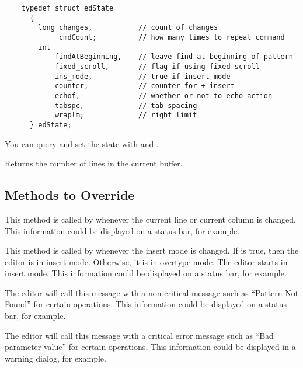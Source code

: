 \footnotesize
\begin{verbatim}
    typedef struct edState
      {
        long changes,           // count of changes
             cmdCount;          // how many times to repeat command
        int
            findAtBeginning,    // leave find at beginning of pattern
            fixed_scroll,       // flag if using fixed scroll
            ins_mode,           // true if insert mode
            counter,            // counter for + insert
            echof,              // whether or not to echo action
            tabspc,             // tab spacing
            wraplm;             // right limit
      } edState;
\end{verbatim}
\normalfont\normalsize

You can query and set the state with  and
.


Returns the number of lines in the current buffer.

\subsection* {Methods to Override} %


This method is called by  whenever the current line
or current column is changed. This information could be displayed
on a status bar, for example.


This method is called by  whenever the
insert mode is changed. If  is true, then
the editor is in insert mode. Otherwise, it is in overtype
mode. The editor starts in insert mode. This information could be displayed
on a status bar, for example.


The editor will call this message with a non-critical message
such as ``Pattern Not Found'' for certain operations.
This information could be displayed on a status bar, for example.


The editor will call this message with a critical error message
such as ``Bad parameter value'' for certain operations.
This information could be displayed in a warning dialog, for example.

